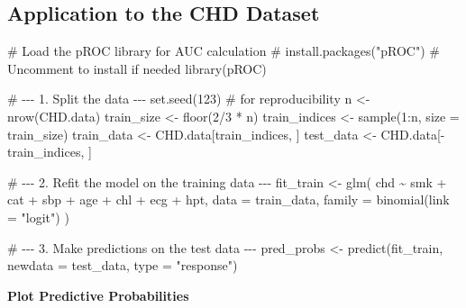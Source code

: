 \documentclass[
  letterpaper,
]{scrbook}
\newenvironment{Shaded}{\begin{snugshade}}{\end{snugshade}}
\newcommand{\AttributeTok}[1]{\textcolor[rgb]{0.40,0.45,0.13}{#1}}
\newcommand{\CommentTok}[1]{\textcolor[rgb]{0.37,0.37,0.37}{#1}}
\newcommand{\DecValTok}[1]{\textcolor[rgb]{0.68,0.00,0.00}{#1}}
\newcommand{\FunctionTok}[1]{\textcolor[rgb]{0.28,0.35,0.67}{#1}}
\newcommand{\NormalTok}[1]{\textcolor[rgb]{0.00,0.23,0.31}{#1}}
\newcommand{\OtherTok}[1]{\textcolor[rgb]{0.00,0.23,0.31}{#1}}
\newcommand{\SpecialCharTok}[1]{\textcolor[rgb]{0.37,0.37,0.37}{#1}}
\newcommand{\StringTok}[1]{\textcolor[rgb]{0.13,0.47,0.30}{#1}}
\begin{document}
\subsection{Application to the CHD
Dataset}\label{application-to-the-chd-dataset}

\begin{Shaded}
\begin{Highlighting}[]
\CommentTok{\# Load the pROC library for AUC calculation}
\CommentTok{\# install.packages("pROC") \# Uncomment to install if needed}
\FunctionTok{library}\NormalTok{(pROC)}

\CommentTok{\# {-}{-}{-} 1. Split the data {-}{-}{-}}
\FunctionTok{set.seed}\NormalTok{(}\DecValTok{123}\NormalTok{) }\CommentTok{\# for reproducibility}
\NormalTok{n }\OtherTok{\textless{}{-}} \FunctionTok{nrow}\NormalTok{(CHD.data)}
\NormalTok{train\_size }\OtherTok{\textless{}{-}} \FunctionTok{floor}\NormalTok{(}\DecValTok{2}\SpecialCharTok{/}\DecValTok{3} \SpecialCharTok{*}\NormalTok{ n)}
\NormalTok{train\_indices }\OtherTok{\textless{}{-}} \FunctionTok{sample}\NormalTok{(}\DecValTok{1}\SpecialCharTok{:}\NormalTok{n, }\AttributeTok{size =}\NormalTok{ train\_size)}
\NormalTok{train\_data }\OtherTok{\textless{}{-}}\NormalTok{ CHD.data[train\_indices, ]}
\NormalTok{test\_data  }\OtherTok{\textless{}{-}}\NormalTok{ CHD.data[}\SpecialCharTok{{-}}\NormalTok{train\_indices, ]}

\CommentTok{\# {-}{-}{-} 2. Refit the model on the training data {-}{-}{-}}
\NormalTok{fit\_train }\OtherTok{\textless{}{-}} \FunctionTok{glm}\NormalTok{(}
\NormalTok{  chd }\SpecialCharTok{\textasciitilde{}}\NormalTok{ smk }\SpecialCharTok{+}\NormalTok{ cat }\SpecialCharTok{+}\NormalTok{ sbp }\SpecialCharTok{+}\NormalTok{ age }\SpecialCharTok{+}\NormalTok{ chl }\SpecialCharTok{+}\NormalTok{ ecg }\SpecialCharTok{+}\NormalTok{ hpt,}
  \AttributeTok{data =}\NormalTok{ train\_data,}
  \AttributeTok{family =} \FunctionTok{binomial}\NormalTok{(}\AttributeTok{link =} \StringTok{"logit"}\NormalTok{)}
\NormalTok{)}

\CommentTok{\# {-}{-}{-} 3. Make predictions on the test data {-}{-}{-}}
\NormalTok{pred\_probs }\OtherTok{\textless{}{-}} \FunctionTok{predict}\NormalTok{(fit\_train, }\AttributeTok{newdata =}\NormalTok{ test\_data, }\AttributeTok{type =} \StringTok{"response"}\NormalTok{)}
\end{Highlighting}
\end{Shaded}

\textbf{Plot Predictive Probabilities}
\end{document}
